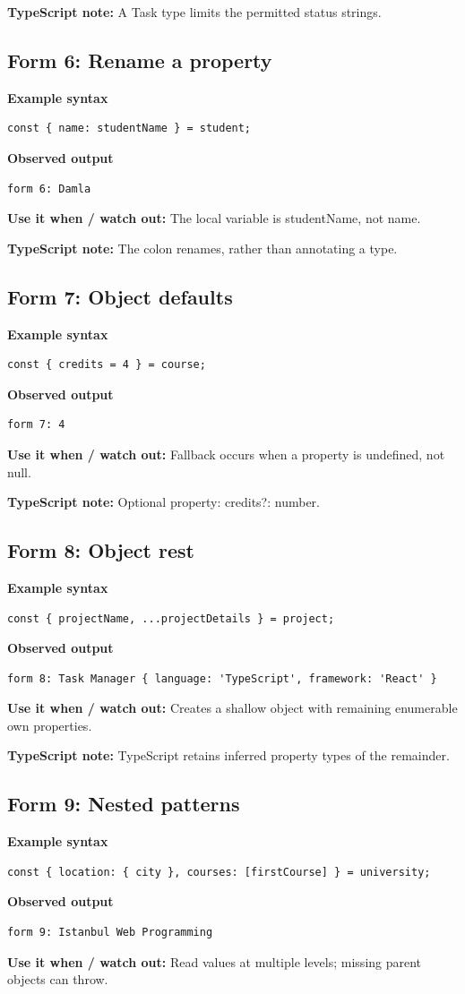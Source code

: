 \documentclass[11pt,a4paper]{article}
\begin{document}
\textbf{TypeScript note:} A Task type limits the permitted status strings.
\subsection{Form 6: Rename a property}
\textbf{Example syntax}
\begin{lstlisting}
const { name: studentName } = student;
\end{lstlisting}
\textbf{Observed output}
\begin{lstlisting}
form 6: Damla
\end{lstlisting}
\textbf{Use it when / watch out:} The local variable is studentName, not name.

\textbf{TypeScript note:} The colon renames, rather than annotating a type.
\subsection{Form 7: Object defaults}
\textbf{Example syntax}
\begin{lstlisting}
const { credits = 4 } = course;
\end{lstlisting}
\textbf{Observed output}
\begin{lstlisting}
form 7: 4
\end{lstlisting}
\textbf{Use it when / watch out:} Fallback occurs when a property is undefined, not null.

\textbf{TypeScript note:} Optional property: credits?: number.
\subsection{Form 8: Object rest}
\textbf{Example syntax}
\begin{lstlisting}
const { projectName, ...projectDetails } = project;
\end{lstlisting}
\textbf{Observed output}
\begin{lstlisting}
form 8: Task Manager { language: 'TypeScript', framework: 'React' }
\end{lstlisting}
\textbf{Use it when / watch out:} Creates a shallow object with remaining enumerable own properties.

\textbf{TypeScript note:} TypeScript retains inferred property types of the remainder.
\subsection{Form 9: Nested patterns}
\textbf{Example syntax}
\begin{lstlisting}
const { location: { city }, courses: [firstCourse] } = university;
\end{lstlisting}
\textbf{Observed output}
\begin{lstlisting}
form 9: Istanbul Web Programming
\end{lstlisting}
\textbf{Use it when / watch out:} Read values at multiple levels; missing parent objects can throw.
\end{document}
